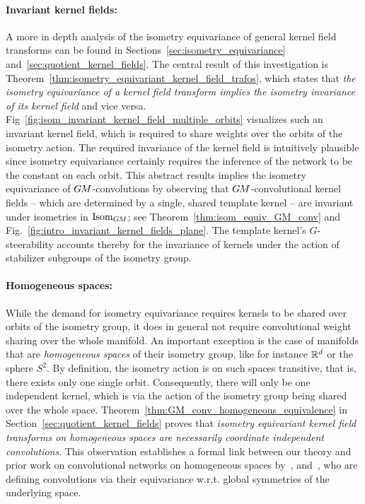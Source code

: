 \paragraph{Invariant kernel fields:}
A more in depth analysis of the isometry equivariance of general kernel field transforms can be found in Sections~\ref{sec:isometry_equivariance} and~\ref{sec:quotient_kernel_fields}.
The central result of this investigation is Theorem~\ref{thm:isometry_equivariant_kernel_field_trafos}, which states that \emph{the isometry equivariance of a kernel field transform implies the isometry invariance of its kernel field} and vice versa.
Fig~\ref{fig:isom_invariant_kernel_field_multiple_orbits} visualizes such an invariant kernel field, which is required to share weights over the orbits of the isometry action.
The required invariance of the kernel field is intuitively plausible since isometry equivariance certainly requires the inference of the network to be the constant on each orbit.
This abstract results implies the isometry equivariance of $G\mkern-1.4muM$-convolutions by observing that $G\mkern-1.4muM$-convolutional kernel fields -- which are determined by a single, shared template kernel -- are invariant under isometries in $\operatorname{Isom}_{G\mkern-1.4muM}$; see Theorem~\ref{thm:isom_equiv_GM_conv} and Fig.~\ref{fig:intro_invariant_kernel_fields_plane}.
The template kernel's $G$-steerability accounts thereby for the invariance of kernels under the action of stabilizer subgroups of the isometry group.



\paragraph{Homogeneous spaces:}
While the demand for isometry equivariance requires kernels to be shared over orbits of the isometry group, it does in general not require convolutional weight sharing over the whole manifold.
An important exception is the case of manifolds that are \emph{homogeneous spaces} of their isometry group, like for instance $\mathbb{R}^d$ or the sphere $S^2$.
By definition, the isometry action is on such spaces transitive, that is, there exists only one single orbit.
Consequently, there will only be one independent kernel, which is via the action of the isometry group being shared over the whole space.
Theorem~\ref{thm:GM_conv_homogeneous_equivalence} in Section~\ref{sec:quotient_kernel_fields} proves that \emph{isometry equivariant kernel field transforms on homogeneous spaces are necessarily coordinate independent convolutions}.
This observation establishes a formal link between our theory and prior work on convolutional networks on homogeneous spaces
by~\citet{Kondor2018-GENERAL}, \citet{Cohen2019-generaltheory} and~\citet{bekkers2020bspline},
who are defining convolutions via their equivariance w.r.t. global symmetries of the underlying space.






